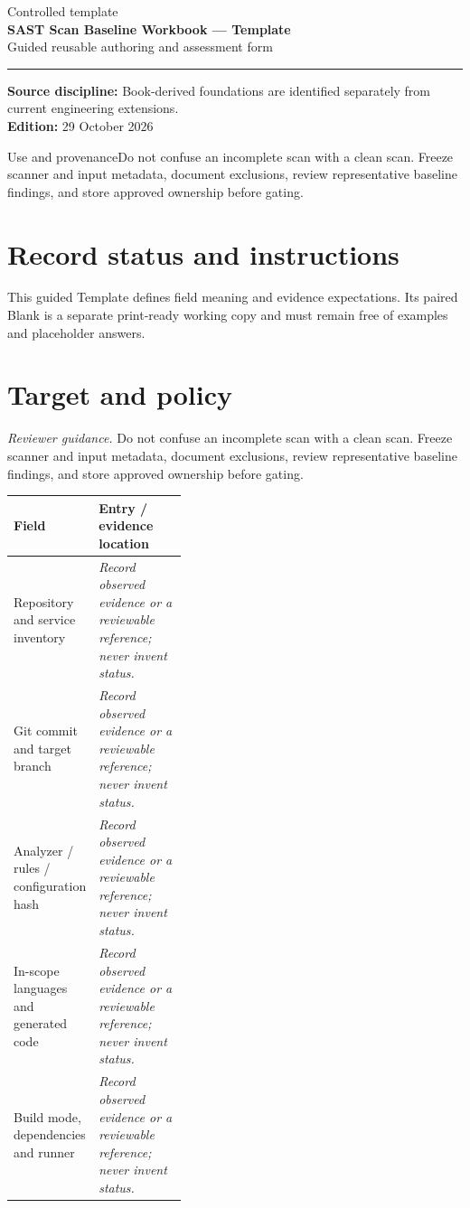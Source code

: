 \documentclass[10pt,letterpaper]{article}
\begin{document}
\hypersetup{pageanchor=false}%
\begin{titlepage}
\vspace*{1.0in}
{\color{bluegray}\Large Controlled template}\\[1.0em]
{\color{navy}\Huge\bfseries SAST Scan Baseline Workbook --- Template}\\[0.7em]
{\Large Guided reusable authoring and assessment form}\\[2.0em]
\rule{\linewidth}{1.0pt}
\vfill
\textbf{Source discipline:} Book-derived foundations are identified separately from current engineering extensions.\\
\textbf{Edition:} 29 October 2026
\end{titlepage}\hypersetup{pageanchor=true}
\tableofcontents
\clearpage
\begin{focusbox}{Use and provenance}Do not confuse an incomplete scan with a clean scan. Freeze scanner and input metadata, document exclusions, review representative baseline findings, and store approved ownership before gating.\end{focusbox}
\section{Record status and instructions}
This guided Template defines field meaning and evidence expectations. Its paired Blank is a separate print-ready working copy and must remain free of examples and placeholder answers.

\section{Target and policy}
\textit{Reviewer guidance.} Do not confuse an incomplete scan with a clean scan. Freeze scanner and input metadata, document exclusions, review representative baseline findings, and store approved ownership before gating.
\begin{tabularx}{\linewidth}{@{}p{0.38\linewidth}Y@{}}
\toprule Field & Entry / evidence location\\\midrule
Repository and service inventory & \textit{Record observed evidence or a reviewable reference; never invent status.}\\[1.0em]
\midrule
Git commit and target branch & \textit{Record observed evidence or a reviewable reference; never invent status.}\\[1.0em]
\midrule
Analyzer / rules / configuration hash & \textit{Record observed evidence or a reviewable reference; never invent status.}\\[1.0em]
\midrule
In-scope languages and generated code & \textit{Record observed evidence or a reviewable reference; never invent status.}\\[1.0em]
\midrule
Build mode, dependencies and runner & \textit{Record observed evidence or a reviewable reference; never invent status.}\\[1.0em]
\midrule
\end{tabularx}
\end{document}
